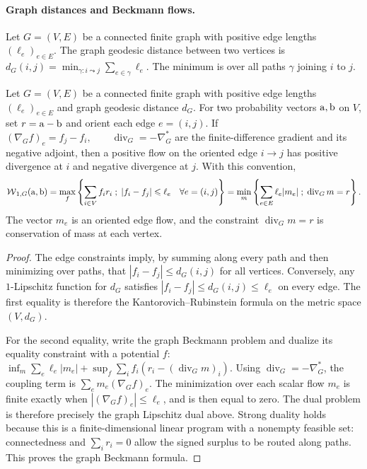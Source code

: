 \paragraph{Graph distances and Beckmann flows.}
\begin{defn}\label{def-graph-geodesic-distance}
Let $G=(V,E)$ be a connected finite graph with positive edge lengths $(\ell_e)_{e\in E}$. The graph geodesic distance between two vertices is \(d_G(i,j)=\min_{\gamma:i\leadsto j}\sum_{e\in\gamma}\ell_e.\)
The minimum is over all paths $\gamma$ joining $i$ to $j$.
\end{defn}
\begin{prop}\label{prop-graph-w1-beckmann}
Let $G=(V,E)$ be a connected finite graph with positive edge lengths $(\ell_e)_{e\in E}$ and graph geodesic distance $d_G$.
For two probability vectors $\mathrm{a},\mathrm{b}$ on $V$, set $r=\mathrm{a}-\mathrm{b}$ and orient each edge $e=(i,j)$. If
\((\nabla_G f)_e=f_j-f_i,\qquad \operatorname{div}_G=-\nabla_G^*\)
are the finite-difference gradient and its negative adjoint, then a positive flow on the oriented edge $i\to j$ has positive divergence at $i$ and negative divergence at $j$. With this convention,
\[
\operatorname{\mathcal{W}}_{1,G}(\mathrm{a},\mathrm{b})
=
\max_f \left\{ \sum_{i\in V} f_i r_i \;;\; |f_i-f_j|\leqslant \ell_e\quad\forall e=(i,j) \right\}
=
\min_m \left\{ \sum_{e\in E}\ell_e |m_e| \;;\; \operatorname{div}_G m=r \right\}.
\]
The vector $m_e$ is an oriented edge flow, and the constraint $\operatorname{div}_G m=r$ is conservation of mass at each vertex.
\end{prop}
\begin{proof}
The edge constraints imply, by summing along every path and then minimizing over paths, that $|f_i-f_j|\leq d_G(i,j)$ for all vertices. Conversely, any $1$-Lipschitz function for $d_G$ satisfies $|f_i-f_j|\leq d_G(i,j)\leq\ell_e$ on every edge. The first equality is therefore the Kantorovich--Rubinstein formula on the metric space $(V,d_G)$.

For the second equality, write the graph Beckmann problem and dualize its equality constraint with a potential $f$: \(\inf_m \sum_e\ell_e|m_e| +\sup_f \sum_i f_i(r_i-(\operatorname{div}_G m)_i).\)
Using $\operatorname{div}_G=-\nabla_G^*$, the coupling term is $\sum_e m_e(\nabla_G f)_e$. The minimization over each scalar flow $m_e$ is finite exactly when $|(\nabla_G f)_e|\leq\ell_e$, and is then equal to zero. The dual problem is therefore precisely the graph Lipschitz dual above. Strong duality holds because this is a finite-dimensional linear program with a nonempty feasible set: connectedness and $\sum_i r_i=0$ allow the signed surplus to be routed along paths. This proves the graph Beckmann formula.
\end{proof}
